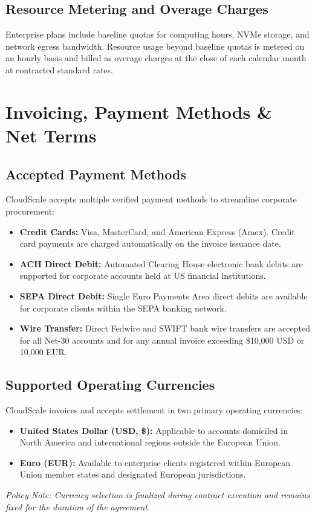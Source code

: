 \documentclass[10pt,letterpaper]{article}
\begin{document}
\subsection{Resource Metering and Overage Charges}
Enterprise plans include baseline quotas for computing hours, NVMe storage, and network egress bandwidth. Resource usage beyond baseline quotas is metered on an hourly basis and billed as overage charges at the close of each calendar month at contracted standard rates.

\section{Invoicing, Payment Methods \& Net Terms}

\subsection{Accepted Payment Methods}
CloudScale accepts multiple verified payment methods to streamline corporate procurement:
\begin{itemize}
  \item \textbf{Credit Cards:} Visa, MasterCard, and American Express (Amex). Credit card payments are charged automatically on the invoice issuance date.
  \item \textbf{ACH Direct Debit:} Automated Clearing House electronic bank debits are supported for corporate accounts held at US financial institutions.
  \item \textbf{SEPA Direct Debit:} Single Euro Payments Area direct debits are available for corporate clients within the SEPA banking network.
  \item \textbf{Wire Transfer:} Direct Fedwire and SWIFT bank wire transfers are accepted for all Net-30 accounts and for any annual invoice exceeding \$10,000 USD or 10,000 EUR.
\end{itemize}

\subsection{Supported Operating Currencies}
CloudScale invoices and accepts settlement in two primary operating currencies:
\begin{itemize}
  \item \textbf{United States Dollar (USD, \$):} Applicable to accounts domiciled in North America and international regions outside the European Union.
  \item \textbf{Euro (EUR):} Available to enterprise clients registered within European Union member states and designated European jurisdictions.
\end{itemize}
\textit{Policy Note: Currency selection is finalized during contract execution and remains fixed for the duration of the agreement.}
\end{document}
